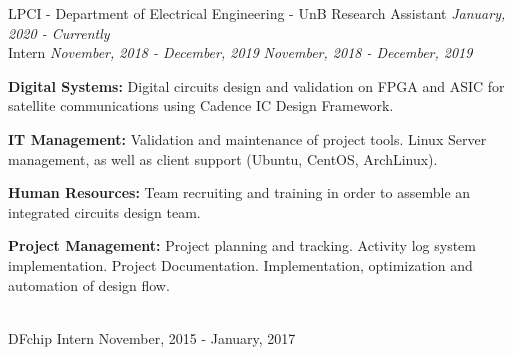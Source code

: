 \documentclass[a4paper]{twentysecondcv} %
\begin{document}
\begin{twenty} %
\twentyitem
    	{LPCI - Department of Electrical Engineering - UnB}
		{Research Assistant \hfill \textit{January, 2020 - Currently}\\}
        {Intern \hfill\textit{November, 2018 - December, 2019}}
        {\textit{November, 2018 - December, 2019}}
        {
            \color{pblue}{\hspace{8pt}-\hspace{4pt}} \color{black}\textbf{Digital Systems: }Digital circuits design and validation on FPGA and ASIC for satellite communications using Cadence IC Design Framework.
            
            \color{pblue}{\hspace{8pt}-\hspace{4pt}} \color{black}\textbf{IT Management: }Validation and maintenance of project tools. Linux Server management, as well as client support (Ubuntu, CentOS, ArchLinux).
            
            \color{pblue}{\hspace{8pt}-\hspace{4pt}} \color{black}\textbf{Human Resources: }Team recruiting and training in order to assemble an integrated circuits design team.
            
            \color{pblue}{\hspace{8pt}-\hspace{4pt}} \color{black}\textbf{Project Management: }Project planning and tracking. Activity log system implementation. Project Documentation. Implementation, optimization and automation of design flow.
        }
        \\
	\twentyitem
    	{DFchip}
		{Intern}
        {November, 2015 - January, 2017}
        {
            \color{pblue}{\hspace{8pt}-\hspace{4pt}} 
            
            \color{pblue}{\hspace{8pt}-\hspace{4pt}} 
            
}
\end{twenty}
\end{document}
